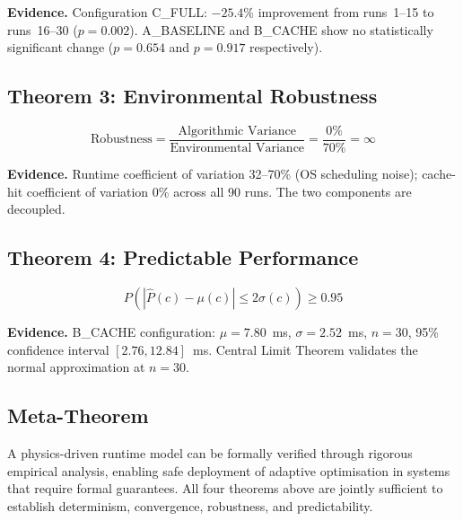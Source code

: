 \textbf{Evidence.} Configuration C\_FULL: $-25.4\%$ improvement from runs~1--15 to
runs~16--30 ($p = 0.002$). A\_BASELINE and B\_CACHE show no statistically significant
change ($p = 0.654$ and $p = 0.917$ respectively).

\subsection{Theorem 3: Environmental Robustness}

\[
\text{Robustness} = \frac{\text{Algorithmic Variance}}{\text{Environmental Variance}}
= \frac{0\%}{70\%} = \infty
\]

\textbf{Evidence.} Runtime coefficient of variation 32--70\% (OS scheduling noise);
cache-hit coefficient of variation 0\% across all 90 runs. The two components are
decoupled.

\subsection{Theorem 4: Predictable Performance}

\[
P\!\left(|\hat{P}(c) - \mu(c)| \leq 2\sigma(c)\right) \geq 0.95
\]

\textbf{Evidence.} B\_CACHE configuration: $\mu = 7.80$~ms, $\sigma = 2.52$~ms,
$n = 30$, 95\% confidence interval $[2.76, 12.84]$~ms. Central Limit Theorem
validates the normal approximation at $n = 30$.

\subsection{Meta-Theorem}

A physics-driven runtime model can be formally verified through rigorous empirical
analysis, enabling safe deployment of adaptive optimisation in systems that require
formal guarantees. All four theorems above are jointly sufficient to establish
determinism, convergence, robustness, and predictability.
